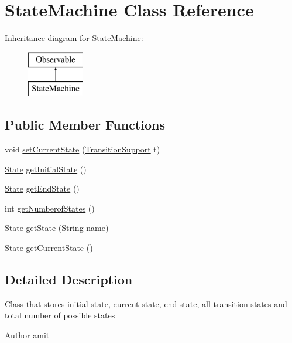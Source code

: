 \hypertarget{class_state_machine}{\section{State\-Machine Class Reference}
\label{class_state_machine}
}
Inheritance diagram for State\-Machine\-:\begin{figure}[H]
\begin{center}
\leavevmode
\includegraphics[height=2.000000cm]{class_state_machine}
\end{center}
\end{figure}
\subsection*{Public Member Functions}
\begin{DoxyCompactItemize}
\item 
void \hyperlink{class_state_machine_ad7ef0f4c2c7390eba41096b57025299c}{set\-Current\-State} (\hyperlink{class_transition_support}{Transition\-Support} t)
\item 
\hyperlink{class_state}{State} \hyperlink{class_state_machine_a31dc2fcca3fb09e8b004b9d21b7c6aa5}{get\-Initial\-State} ()
\item 
\hyperlink{class_state}{State} \hyperlink{class_state_machine_a8ec03fd0f1350838b05ea8765d0f012a}{get\-End\-State} ()
\item 
int \hyperlink{class_state_machine_a97dc1b3bc38a8d046035ef52dc8b2621}{get\-Numberof\-States} ()
\item 
\hyperlink{class_state}{State} \hyperlink{class_state_machine_afb2aab31dddcbefe3d4cb9eb5fdef61f}{get\-State} (String name)
\item 
\hyperlink{class_state}{State} \hyperlink{class_state_machine_adfe7ca2ef6ac4763ad49fde662564ec1}{get\-Current\-State} ()
\end{DoxyCompactItemize}


\subsection{Detailed Description}
Class that stores initial state, current state, end state, all transition states and total number of possible states \begin{DoxyAuthor}{Author}
amit 
\end{DoxyAuthor}


